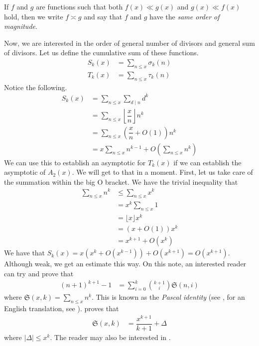 \documentclass[elemannt.tex]{subfile}
\begin{document}
		\begin{definition}
			If $f$ and $g$ are functions such that both $f(x)\ll g(x)$ and $g(x)\ll f(x)$ hold, then we write $f\asymp g$ and say that $f$ and $g$ have the \textit{same order of magnitude}.
		\end{definition}\par
	Now, we are interested in the order of general number of divisors and general sum of divisors. Let us define the cumulative sum of these functions.
		\begin{align*}
			S_{k}(x)
				& = \sum_{n\leq x}\sigma_{k}(n)\\
			T_{k}(x)
				& = \sum_{n\leq x}\tau_{k}(n)
		\end{align*}
	Notice the following.
		\begin{align*}
			S_{k}(x)
				& = \sum_{n\leq x}\sum_{d\mid n}d^{k}\\
				& = \sum_{n\leq x}\left\lfloor{\dfrac{x}{n}}\right\rfloor n^{k}\\
				& = \sum_{n\leq x}\left(\dfrac{x}{n}+O(1)\right)n^{k}\\
				& = x\sum_{n\leq x}n^{k-1}+O\left(\sum_{n\leq x}n^{k}\right)
		\end{align*}
	We can use this to establish an asymptotic for $T_{k}(x)$ if we can establish the asymptotic of $A_{2}(x)$. We will get to that in a moment. First, let us take care of the summation within the big O bracket. We have the trivial inequality that
		\begin{align*}
			\sum_{n\leq x}n^{k}
				& \leq \sum_{n\leq x}x^{k}\\
				& = x^{k}\sum_{n\leq x}1\\
				& = \lfloor{x}\rfloor x^{k}\\
				& = (x+O(1))x^{k}\\
				& = x^{k+1}+O(x^{k})
		\end{align*}
	We have that $S_{k}(x)=x\left(x^{k}+O(x^{k-1})\right)+O(x^{k+1})=O(x^{k+1})$. Although weak, we get an estimate this way. On this note, an interested reader can try and prove that
		\begin{align*}
			(n+1)^{k+1}-1
				& =\sum_{i=0}^{k}\binom{k+1}{i}\mathfrak{S}(n,i)
		\end{align*}
	where $\mathfrak{S}(x,k)=\sum_{n\leq x}n^{k}$. This is known as the \textit{Pascal identity} (see \textcite{pascal_1964}, for an English translation, see \textcite{knoebel_laubenbacher_lodder_pengelley_2007}). \textcite[Chapter II, Theorem $1$]{lehmer_1900} proves that
		\begin{align}
			\mathfrak{S}(x,k)
				& = \dfrac{x^{k+1}}{k+1}+\Delta\label{eqn:lehmers}
		\end{align}
	where $|\Delta|\leq x^{k}$. The reader may also be interested in \textcite{kieren_macmillan_jonathan_sondow_2011}.
	
\end{document}
